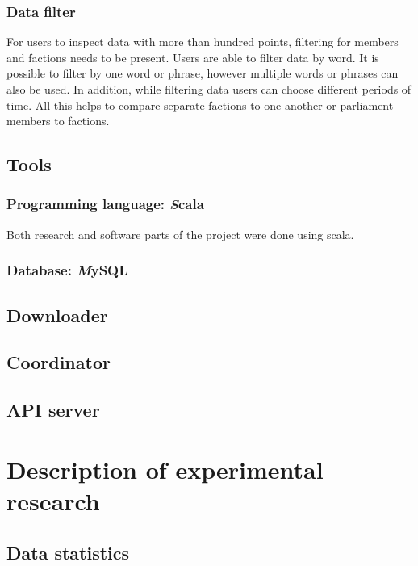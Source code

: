 \documentclass[a4paper,12pt]{article}
\begin{document}
	\subsubsection{Data filter}
	
	For users to inspect data with more than hundred points, filtering for members and factions needs to be present. Users are able to filter data by word. It is possible to filter by one word or phrase, however multiple words or phrases can also be used. In addition, while filtering data users can choose different periods of time. All this helps to compare separate factions to one another or parliament members to factions.
	
	\clearpage

  	\subsection{Tools}
    \subsubsection{Programming language: {\textit Scala}}
    
    Both research and software parts of the project were done using \gls{scala}. 
    
    \subsubsection{Database: {\textit MySQL}}
    \subsection{Downloader}
    \subsection{Coordinator}
    \subsection{API server}
    \clearpage
    
    \section{Description of experimental research}
    \subsection{Data statistics}
    
\end{document}
